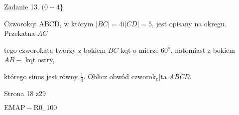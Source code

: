 \documentclass[a4paper,12pt]{article}
\begin{document}
Zadanie 13. $(0-4$\}

Czworokqt ABCD, w którym $|BC|=4 \mathrm{i} |CD|=5$, jest opisany na okregu. Przekatna $AC$

tego czworokata tworzy z bokiem $BC$ kqt o mierze $60^{\mathrm{o}}$, natomiast z bokiem $AB-$ kqt ostry,

którego sinus jest równy $\displaystyle \frac{1}{4}$. Oblicz obwód $\mathrm{c}\mathrm{z}\mathrm{w}\mathrm{o}\mathrm{r}\mathrm{o}\mathrm{k}_{\mathrm{c}}$]$\mathrm{t}\mathrm{a}$ {\it ABCD}.

Strona 18 z29

$\mathrm{E}\mathrm{M}\mathrm{A}\mathrm{P}-\mathrm{R}0_{-}100$
\end{document}
